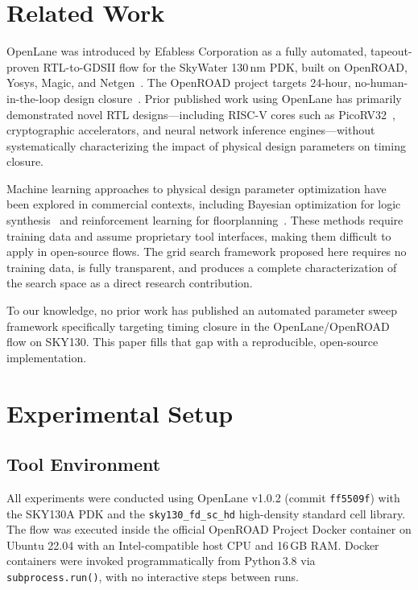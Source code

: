 \documentclass[conference]{IEEEtran}
\begin{document}
\section{Related Work}

OpenLane was introduced by Efabless Corporation as a fully automated,
tapeout-proven RTL-to-GDSII flow for the SkyWater 130\,nm PDK, built
on OpenROAD, Yosys, Magic, and Netgen~\cite{shalan2020}. The OpenROAD
project targets 24-hour, no-human-in-the-loop design
closure~\cite{ajayi2019}. Prior published work using OpenLane has
primarily demonstrated novel RTL designs---including RISC-V cores such
as PicoRV32~\cite{wolf2015}, cryptographic accelerators, and neural
network inference engines---without systematically characterizing the
impact of physical design parameters on timing closure.

Machine learning approaches to physical design parameter optimization
have been explored in commercial contexts, including Bayesian
optimization for logic synthesis~\cite{liang2020} and reinforcement
learning for floorplanning~\cite{mirhoseini2021}. These methods
require training data and assume proprietary tool interfaces, making
them difficult to apply in open-source flows. The grid search
framework proposed here requires no training data, is fully
transparent, and produces a complete characterization of the search
space as a direct research contribution.

To our knowledge, no prior work has published an automated parameter
sweep framework specifically targeting timing closure in the
OpenLane/OpenROAD flow on SKY130. This paper fills that gap with a
reproducible, open-source implementation.

\section{Experimental Setup}

\subsection{Tool Environment}

All experiments were conducted using OpenLane v1.0.2 (commit
\texttt{ff5509f}) with the SKY130A PDK and the
\texttt{sky130\_fd\_sc\_hd} high-density standard cell library. The
flow was executed inside the official OpenROAD Project Docker container
on Ubuntu 22.04 with an Intel-compatible host CPU and 16\,GB RAM.
Docker containers were invoked programmatically from Python\,3.8 via
\texttt{subprocess.run()}, with no interactive steps between runs.
\end{document}
